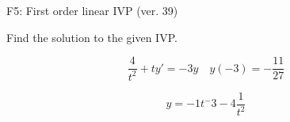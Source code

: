 \begin{exercise}
  \begin{exerciseTitle}F5: First order linear IVP (ver. 39)\end{exerciseTitle}
  \begin{exerciseStatement}
    
Find the solution to the given IVP.

    
\[\frac{4}{t^{2}} +ty'= -3 y \hspace{1em} y( -3 ) = -\frac{11}{27}\]

  \end{exerciseStatement}
  \begin{exerciseAnswer}
    
\[y= -1 t^ -3 -4 \frac{1}{t^{2}}\]

  \end{exerciseAnswer}
\end{exercise}